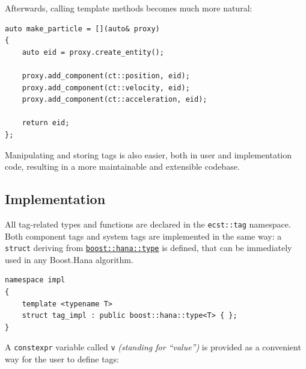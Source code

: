 \documentclass[twoside, 12pt, a4paper, openany]{book}
\begin{document}
Afterwards, calling template methods becomes much more natural:

\begin{verbatim}
auto make_particle = [](auto& proxy)
{
    auto eid = proxy.create_entity();

    proxy.add_component(ct::position, eid);
    proxy.add_component(ct::velocity, eid);
    proxy.add_component(ct::acceleration, eid);

    return eid;
};
\end{verbatim}

Manipulating and storing tags is also easier, both in user and
implementation code, resulting in a more maintainable and extensible
codebase.

\subsection{Implementation}\label{implementation-3}

All tag-related types and functions are declared in the
\texttt{ecst::tag}
namespace. Both component tags and system tags are implemented in the
same way: a
\texttt{struct}
deriving from
\href{http://www.boost.org/doc/libs/1_61_0/libs/hana/doc/html/structboost_1_1hana_1_1type.html}{\texttt{boost::hana::type}}
is defined, that can be immediately used in any Boost.Hana algorithm.

\begin{verbatim}
namespace impl
{
    template <typename T>
    struct tag_impl : public boost::hana::type<T> { };
}
\end{verbatim}

A
\texttt{constexpr}
variable called
\texttt{v}
\emph{(standing for ``value'')} is provided as a convenient way for the
user to define tags:
\end{document}
